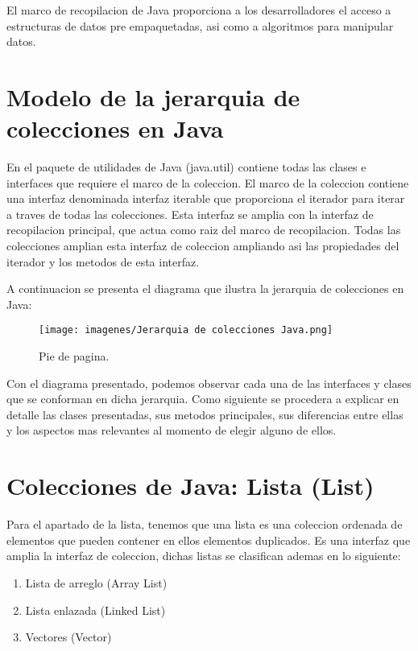 \documentclass[12pt, letterpaper]{article} %
\begin{document}
El marco de recopilacion de Java proporciona a los desarrolladores el acceso a estructuras de datos pre empaquetadas, asi como a algoritmos para manipular datos.

\section*{Modelo de la jerarquia de colecciones en Java}
En el paquete de utilidades de Java (java.util) contiene todas las clases e interfaces que requiere el marco de la coleccion. El marco de la coleccion contiene una interfaz denominada interfaz iterable que proporciona el iterador para iterar a traves de todas las colecciones. Esta interfaz se amplia con la interfaz de recopilacion principal, que actua como raiz del marco de recopilacion. Todas las colecciones amplian esta interfaz de coleccion ampliando asi las propiedades del iterador y los metodos de esta interfaz.

A continuacion se presenta el diagrama que ilustra la jerarquia de colecciones en Java:
\begin{figure}[h]
    \centering
    \texttt{[image: imagenes/Jerarquia de colecciones Java.png]}
    \caption{Pie de pagina.}
    \label{fig:jerarquia}
\end{figure}

Con el diagrama presentado, podemos observar cada una de las interfaces y clases que se conforman en dicha jerarquia. Como siguiente se procedera a explicar en detalle  las clases presentadas, sus metodos principales, sus diferencias entre ellas y los aspectos mas relevantes al momento de elegir alguno de ellos.

\section{Colecciones de Java: Lista (List)}
Para el apartado de la lista, tenemos que una lista es una coleccion ordenada de elementos que pueden contener en ellos elementos duplicados. Es una interfaz que amplia la interfaz de coleccion, dichas listas se clasifican ademas en lo siguiente:

\begin{enumerate}
    \item Lista de arreglo (Array List)
    \item Lista enlazada (Linked List)
    \item Vectores (Vector)
\end{enumerate}
\end{document}
